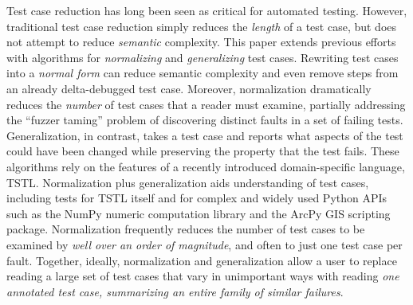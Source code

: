 Test case reduction has long been seen as critical for automated testing.  However, traditional test case reduction simply reduces the \emph{length} of a test case, but does not attempt to reduce \emph{semantic} complexity.  This paper extends previous efforts with algorithms for \emph{normalizing} and \emph{generalizing} test cases.  Rewriting test cases into a \emph{normal form} can reduce semantic complexity and even remove steps from an already delta-debugged test case.  Moreover, normalization dramatically reduces the \emph{number} of test cases that a reader must examine, partially addressing the ``fuzzer taming'' problem of discovering distinct faults in a set of failing tests.  Generalization, in contrast, takes a test case and reports what aspects of the test could have been changed while preserving the property that the test fails.  These algorithms rely on the features of a recently introduced domain-specific language, TSTL.  Normalization plus generalization aids understanding of test cases, including tests for TSTL itself and for complex and widely used Python APIs such as the NumPy numeric computation library and the ArcPy GIS scripting package.  Normalization frequently reduces the number of test cases to be examined by \emph{well over an order of magnitude}, and often to just one test case per fault.  Together, ideally, normalization and generalization allow a user to replace reading a large set of test cases that vary in unimportant ways with reading \emph{one annotated test case, summarizing an entire family of similar failures}.